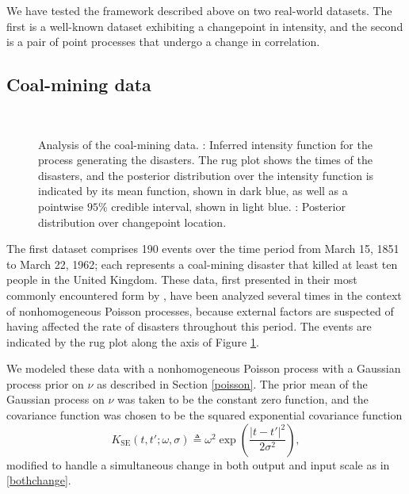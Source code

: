 \documentclass{article}
\newcommand{\deq}{\triangleq}
\newcommand{\psff}[1]{\texttt{[image: figures/\#1.eps]}}
\begin{document}
We have tested the framework described above on two real-world
datasets.  The first is a well-known dataset exhibiting a changepoint
in intensity, and the second is a pair of point processes that undergo
a change in correlation.

\subsection{Coal-mining data}

\begin{figure}
  \centering
  \subfloat[][]{
    \psff{posterior}
    \label{posterior}
  }
  \\
  \subfloat[][]{
    \psff{changepoint}
    \label{changepoint}
  }
  \caption{Analysis of the coal-mining data.  :
    Inferred intensity function for the process generating the
    disasters.  The rug plot shows the times of the disasters, and the
    posterior distribution over the intensity function is indicated by
    its mean function, shown in dark blue, as well as a pointwise
    $95$\% credible interval, shown in light blue.
    : Posterior distribution over changepoint
    location.  }
  \label{coal}
\end{figure}

The first dataset comprises 190 events over the time period from March
15, 1851 to March 22, 1962; each represents a coal-mining disaster
that killed at least ten people in the United Kingdom.  These data,
first presented in their most commonly encountered form by
\citet{jarrett}, have been analyzed several times in the context of
nonhomogeneous Poisson processes, because external factors are
suspected of having affected the rate of disasters throughout this
period.  The events are indicated by the rug plot along the axis of
Figure \ref{coal}.

We modeled these data with a nonhomogeneous Poisson process with a
Gaussian process prior on $\nu$ as described in Section \ref{poisson}.
The prior mean of the Gaussian process on $\nu$ was taken to be the
constant zero function, and the covariance function was chosen to be
the squared exponential covariance function
\begin{equation}
  \label{sqdexp}
  K_{\text{SE}}(t, t'; \omega, \sigma)
  \deq
  \omega^2
  \exp
  \left(
  \frac{ \lvert t - t' \rvert^2}{2\sigma^2}
  \right),
\end{equation}
modified to handle a simultaneous change in both output and input
scale as in \eqref{bothchange}.
\end{document}
